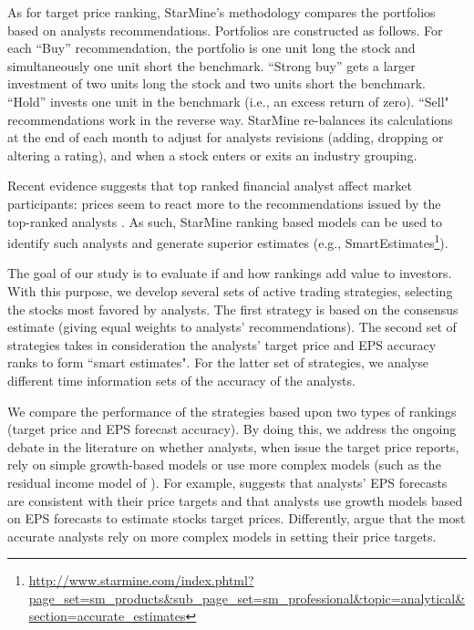\documentclass{article}\usepackage[]{graphicx}\usepackage[]{color}
\begin{document}
As for target price ranking, StarMine's methodology compares the portfolios based on analysts recommendations. Portfolios are constructed as follows. For each ``Buy'' recommendation, the portfolio is one unit long the stock and simultaneously one unit short the benchmark. ``Strong buy'' gets a larger investment of two units long the stock and two units short the benchmark. ``Hold'' invests one unit in the benchmark (i.e., an excess return of zero). ``Sell" recommendations work in the reverse way. StarMine re-balances its calculations at the end of each month to adjust for analysts revisions (adding, dropping or altering a rating), and when a stock enters or exits an industry grouping.


Recent evidence suggests that top ranked financial analyst affect market participants: prices seem to react more to the recommendations issued by the top-ranked analysts \citep{emery2009}. As such, StarMine ranking based models can be used to identify such analysts and generate superior estimates (e.g., SmartEstimates\footnote{\url{http://www.starmine.com/index.phtml?page_set=sm_products&sub_page_set=sm_professional&topic=analytical&section=accurate_estimates}}).



The goal of our study is to evaluate if and how rankings  add value to investors.  With this purpose, we develop several sets of active trading strategies, selecting the stocks most favored by analysts. The first strategy is based on the consensus estimate (giving equal weights to analysts' recommendations). The second set of strategies takes in consideration the analysts' target price and EPS accuracy ranks to form ``smart estimates". For the latter set of strategies, we analyse different time information sets of the accuracy of the analysts.


We compare the performance of the strategies based upon two types of rankings (target price and EPS forecast accuracy). By doing this, we address the ongoing debate in the literature on whether analysts, when issue the target price reports, rely on simple growth-based models or use more complex models (such as the residual income model of \cite{ohlson1995}). For example, \cite{bradshaw2004} suggests that analysts' EPS forecasts are consistent with their price targets and that analysts use growth models based on EPS forecasts to estimate stocks target prices. Differently, \cite{simon2011} argue that the most accurate analysts rely on more complex models in setting their price targets. 
\end{document}
